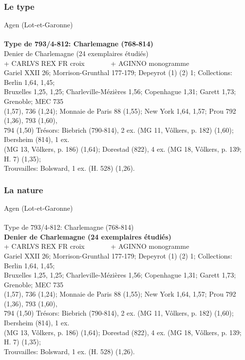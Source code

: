 \documentclass[10pt, compress]{beamer}
\begin{document}
\begin{frame}[fragile]
  \frametitle{Le type}
  \begin{scriptsize}
\textcolor{light_gray}{Agen (Lot-et-Garonne)}\\~\\

\textbf{Type de 793/4-812: Charlemagne (768-814)}\\
\textcolor{light_gray}{
Denier de Charlemagne (24 exemplaires étudiés)\\
+ CARLVS REX FR croix~~~~~~~ + AGINNO monogramme\\
Gariel XXII 26; Morrison-Grunthal 177-179; Depeyrot (1) (2) 1; Collections: Berlin 1,64, 1,45; \\
Bruxelles 1,25, 1,25; Charleville-Mézières 1,56; Copenhague 1,31; Garett 1,73; Grenoble; MEC 735 \\
(1,57), 736 (1,24); Monnaie de Paris 88 (1,55); New York 1,64, 1,57; Prou 792 (1,36), 793 (1,60), \\
794 (1,50) Trésors: Biebrich (790-814), 2 ex. (MG 11, Vôlkers, p. 182) (1,60); Ibersheim (814), 1 ex. \\
(MG 13, Vôlkers, p. 186) (1,64); Dorestad (822), 4 ex. (MG 18, Vôlkers, p. 139; H. 7) (1,35); \\Trouvailles: Bolsward, 1 ex. (H. 528) (1,26).
} 
    \end{scriptsize}
    
\end{frame}

\begin{frame}[fragile]
  \frametitle{La nature}
  \begin{scriptsize}
\textcolor{light_gray}{Agen (Lot-et-Garonne)}\\~\\

\textcolor{light_gray}{Type de 793/4-812: Charlemagne (768-814)}\\

\textbf{Denier de Charlemagne (24 exemplaires étudiés)}\\
\textcolor{light_gray}{
+ CARLVS REX FR croix~~~~~~~ + AGINNO monogramme\\
Gariel XXII 26; Morrison-Grunthal 177-179; Depeyrot (1) (2) 1; Collections: Berlin 1,64, 1,45; \\
Bruxelles 1,25, 1,25; Charleville-Mézières 1,56; Copenhague 1,31; Garett 1,73; Grenoble; MEC 735 \\
(1,57), 736 (1,24); Monnaie de Paris 88 (1,55); New York 1,64, 1,57; Prou 792 (1,36), 793 (1,60), \\
794 (1,50) Trésors: Biebrich (790-814), 2 ex. (MG 11, Vôlkers, p. 182) (1,60); Ibersheim (814), 1 ex. \\
(MG 13, Vôlkers, p. 186) (1,64); Dorestad (822), 4 ex. (MG 18, Vôlkers, p. 139; H. 7) (1,35); \\Trouvailles: Bolsward, 1 ex. (H. 528) (1,26).
} 
    \end{scriptsize}
\end{frame}
\end{document}
